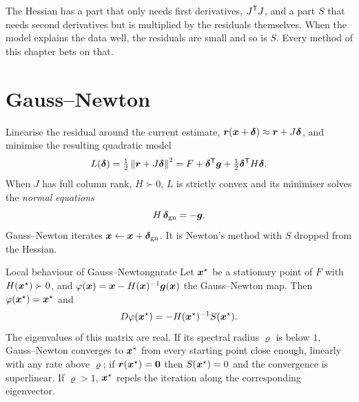 \begin{inwords}
The Hessian has a part that only needs first derivatives, $J^{\mathsf{T}} J$, and a
part $S$ that needs second derivatives but is multiplied by the residuals
themselves. When the model explains the data well, the residuals are
small and so is $S$. Every method of this chapter bets on that.
\end{inwords}

\section{Gauss--Newton}

Linearise the residual around the current estimate,
$\bm{r}(\bm{x}+\bm{\delta})\approx\bm{r}+J\bm{\delta}$, and minimise the
resulting quadratic model
\begin{equation}\label{eq:model}
L(\bm{\delta})=\tfrac12\left\lVert \bm{r}+J\bm{\delta}\right\rVert^2
=F+\bm{\delta}^{\mathsf{T}}\bm{g}+\tfrac12\bm{\delta}^{\mathsf{T}} H\bm{\delta} .
\end{equation}
When $J$ has full column rank, $H\succ0$, $L$ is strictly convex and its
minimiser solves the \emph{normal equations}
\begin{equation}\label{eq:gn}
H\,\bm{\delta}_{\mathrm{gn}}=-\bm{g}.
\end{equation}
Gauss--Newton iterates $\bm{x}\leftarrow\bm{x}+\bm{\delta}_{\mathrm{gn}}$. It is
Newton's method with $S$ dropped from the Hessian.

\begin{theorem}{Local behaviour of Gauss--Newton}{gnrate}
Let $\bm{x}^\star$ be a stationary point of $F$ with $H(\bm{x}^\star)\succ0$,
and $\varphi(\bm{x})=\bm{x}-H(\bm{x})^{-1}\bm{g}(\bm{x})$ the Gauss--Newton map. Then
$\varphi(\bm{x}^\star)=\bm{x}^\star$ and
\[
D\varphi(\bm{x}^\star)=-H(\bm{x}^\star)^{-1}S(\bm{x}^\star).
\]
The eigenvalues of this matrix are real. If its spectral radius
$\varrho$ is below $1$, Gauss--Newton converges to $\bm{x}^\star$ from every
starting point close enough, linearly with any rate above $\varrho$; if
$\bm{r}(\bm{x}^\star)=\bm{0}$ then $S(\bm{x}^\star)=0$ and the convergence is
superlinear. If $\varrho>1$, $\bm{x}^\star$ repels the iteration along the
corresponding eigenvector.
\end{theorem}

